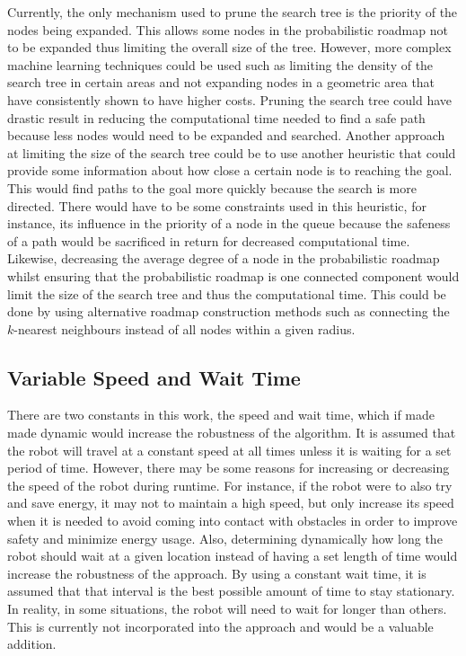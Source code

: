 Currently, the only mechanism used to prune the search tree is the priority of
the nodes being expanded. This allows some nodes in the probabilistic roadmap
not to be expanded thus limiting the overall size of the tree. However, more
complex machine learning techniques could be used such as limiting the density
of the search tree in certain areas and not expanding nodes in a geometric area
that have consistently shown to have higher costs. Pruning the search tree
could have drastic result in reducing the computational time needed to find a
safe path because less nodes would need to be expanded and searched. Another
approach at limiting the size of the search tree could be to use another
heuristic that could provide some information about how close a certain node is
to reaching the goal. This would find paths to the goal more quickly because
the search is more directed. There would have to be some constraints used in
this heuristic, for instance, its influence in the priority of a node in the
queue because the safeness of a path would be sacrificed in return for
decreased computational time. Likewise, decreasing the average degree of a node
in the probabilistic roadmap whilst ensuring that the probabilistic roadmap is
one connected component would limit the size of the search tree and thus the
computational time.  This could be done by using alternative roadmap
construction methods such as connecting the $k$-nearest neighbours instead of
all nodes within a given radius.

\subsection{Variable Speed and Wait Time}

There are two constants in this work, the speed and wait time, which if made
made dynamic would increase the robustness of the algorithm. It is assumed that
the robot will travel at a constant speed at all times unless it is waiting for
a set period of time. However, there may be some reasons for increasing or
decreasing the speed of the robot during runtime. For instance, if the robot
were to also try and save energy, it may not to maintain a high speed, but only
increase its speed when it is needed to avoid coming into contact with
obstacles in order to improve safety and minimize energy usage. Also,
determining dynamically how long the robot should wait at a given location
instead of having a set length of time would increase the robustness of the
approach. By using a constant wait time, it is assumed that that interval is
the best possible amount of time to stay stationary. In reality, in some
situations, the robot will need to wait for longer than others. This is
currently not incorporated into the approach and would be a valuable addition.

